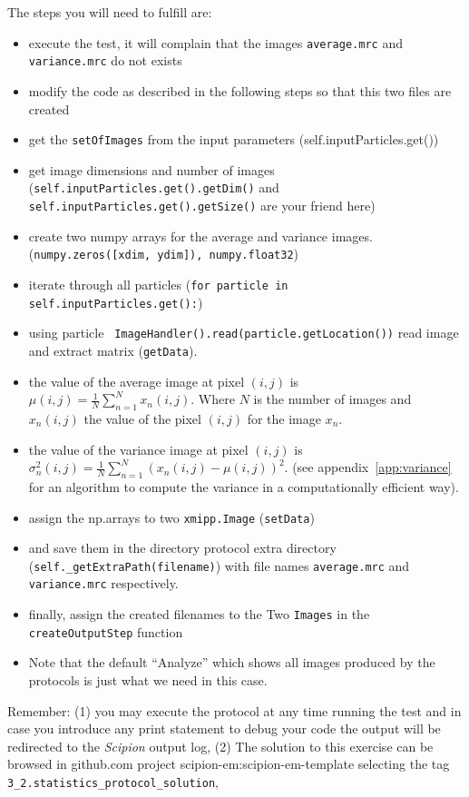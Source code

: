 \documentclass[12pt]{article} %
\def\scipion{\textit{Scipion}\xspace}
\newcommand{\ttt}[1]{\texttt{#1}}
\begin{document}
The steps you will need to fulfill are:
\begin{itemize}
 \item execute the test, it will complain that the images \ttt{average.mrc} and \ttt{variance.mrc} do not exists
 \item modify the code as described in the following steps so that this two files are created
 \item get the \ttt{setOfImages} from the input parameters (self.inputParticles.get())
 \item get image dimensions and number of images (\ttt{self.inputParticles.get().getDim()} and \ttt{self.inputParticles.get().getSize()} are your friend here)
 \item create two numpy arrays for the average and variance images. (\ttt{numpy.zeros([xdim, ydim]), numpy.float32})
 \item iterate through all particles (\ttt{for particle in self.inputParticles.get():})
 \item using particle \ttt{ ImageHandler().read(particle.getLocation())} read image and extract matrix (\ttt{getData}).
 \item the value of the average image at pixel $(i,j)$ is $\mu(i,j)=\frac {1}{N}\sum _{n=1}^{N}x_n(i,j)$. Where $N$ is the number of images and $x_n(i,j)$ the value of the pixel $(i,j)$ for the image $x_n$.
 \item the value of the variance image at pixel $(i,j)$ is\\ $\sigma^2_n(i,j)={ {{\frac {1}{N}}\sum _{n=1}^{N}\left(x_n(i,j)-{\mu(i,j)}\right)^{2}}}$. (see appendix~\ref{app:variance} for an algorithm to compute the variance in a computationally efficient way).
 \item assign the np.arrays to two \ttt{xmipp.Image} (\ttt{setData})
 \item and save them in the directory protocol extra directory (\ttt{self.\_getExtraPath(filename)}) with file names \ttt{average.mrc} and \ttt{variance.mrc} respectively.
 \item finally, assign the created filenames to the Two \ttt{Images} in the \ttt{createOutputStep} function
 \item Note that the default ``Analyze'' which shows all images produced by the protocols is just what we need in this case.
\end{itemize}

Remember: (1)  you may execute the protocol at any time running the test and in case you introduce
any print statement to debug your code the output will be redirected to the \scipion output log, (2) The solution
to this exercise can be browsed in github.com project scipion-em:scipion-em-template selecting the tag \ttt{3\_2.statistics\_protocol\_solution},
\end{document}
